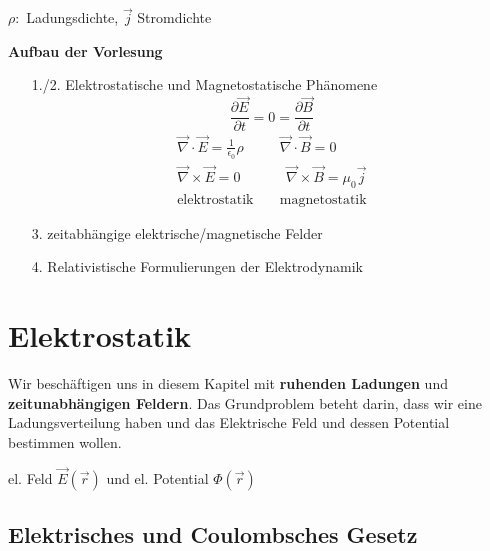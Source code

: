 \documentclass[titlepage,11pt,a4paper,ngerman]{report}
\newcommand{\tx}[1]{\textrm{#1}}
\begin{document}

\noindent
$ \rho :$ Ladungsdichte, $ \vec{j} $ Stromdichte
\\[10pt]
\begin{Large}
	\textbf{Aufbau der Vorlesung}
\end{Large}
\begin{itemize}
	\item[1./2.] Elektrostatische und Magnetostatische Phänomene
	\begin{equation*}
	\frac{\partial \vec{E}}{\partial t} = 0 = \frac{\partial \vec{B}}{\partial t}
	\end{equation*}
	\begin{equation*}
	\begin{array}{ccc}
	\vec{\nabla} \cdot \vec{E} = \frac{1}{\epsilon_0} \rho & & \vec{\nabla} \cdot \vec{B} = 0\\
	\vec{\nabla} \times \vec{E} = 0 \quad \ & & \ \ \vec{\nabla} \times \vec{B} = \mu_0 \vec{j}\\[5pt]
	\tx{elektrostatik} & & \tx{magnetostatik}
	\end{array}
	\end{equation*}	
	\item[3.] zeitabhängige elektrische/magnetische Felder
	\item[4.] Relativistische Formulierungen der Elektrodynamik
\end{itemize}

\chapter{Elektrostatik}

Wir beschäftigen uns in diesem Kapitel mit \textbf{ruhenden Ladungen} und \textbf{zeitunabhängigen Feldern}. Das Grundproblem beteht darin, dass wir eine Ladungsverteilung haben und das Elektrische Feld und dessen Potential bestimmen wollen.





el. Feld $ \vec{E}(\vec{r}) $ und el. Potential $ \Phi(\vec{r}) $


\section{Elektrisches und Coulombsches Gesetz}
\end{document}
